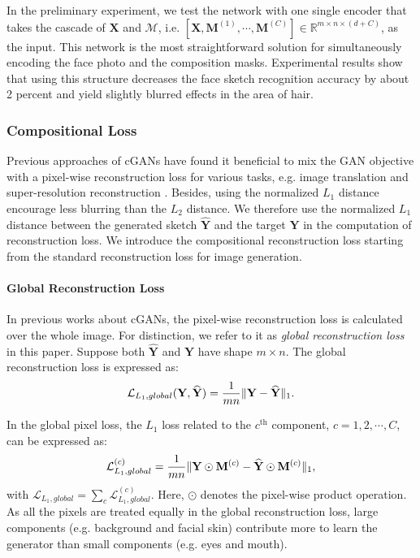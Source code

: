 \documentclass[journal]{IEEEtran}
\begin{document}
In the preliminary experiment, we test the network with one single encoder that takes the cascade of $\mathbf{X}$ and $\mathcal{M}$, i.e. $[\mathbf{X}, \mathbf{M}^{(1)}, \cdots, \mathbf{M}^{(C)}] \in \mathbb{R}^{m \times n \times (d+C)}$, as the input.
This network is the most straightforward solution for simultaneously encoding the face photo and the composition masks. Experimental results show that using this structure decreases the face sketch recognition accuracy by about 2 percent and yield slightly blurred effects in the area of hair.



\subsubsection{Compositional Loss}
\label{sec:comploss}

Previous approaches of cGANs have found it beneficial to mix the GAN objective with a pixel-wise reconstruction loss for various tasks, e.g. image translation \cite{Isola2017Pix2Pix} and super-resolution reconstruction \cite{Johnson2016Perceptual}. Besides, using the normalized $L_1$ distance encourage less blurring than the $L_2$ distance. We therefore use the normalized $L_1$ distance between the generated sketch $\widehat{\mathbf{Y}}$ and the target $\mathbf{Y}$ in the computation of reconstruction loss. We introduce the compositional reconstruction loss starting from the standard reconstruction loss for image generation. 

\paragraph{Global Reconstruction Loss}
In previous works about cGANs, the pixel-wise reconstruction loss is calculated over the whole image. For distinction, we refer to it as \textit{global reconstruction loss} in this paper. Suppose both $\widehat{\mathbf{Y}}$ and $\mathbf{Y}$ have shape $m \times n$. The global reconstruction loss is expressed as:
\begin{equation}
\label{eq:lossglobal}
\mathcal{L}_{L_1, global} (\mathbf{Y}, \widehat{\mathbf{Y}}) = \frac{1}{mn} \Arrowvert \mathbf{Y} - \widehat{\mathbf{Y}} \Arrowvert_1.
\end{equation}

In the global pixel loss, the $L_1$ loss related to the $c^{\text{th}}$ component, $c=1,2,\cdots,C$, can be expressed as:
\begin{equation}
\mathcal{L}_{L_1, global}^{(c)} = \frac{1}{mn} \Arrowvert \mathbf{Y} \odot \mathbf{M}^{(c)} - \widehat{\mathbf{Y}} \odot \mathbf{M}^{(c)} \Arrowvert_1,
    \label{eq:pixlosscmp}
\end{equation}
with $\mathcal{L}_{L_1, global} = \sum_c{\mathcal{L}_{L_1, global}^{(c)}}$. Here, $\odot$ denotes the pixel-wise product operation. 
As all the pixels are treated equally in the global reconstruction loss, large components (e.g. background and facial skin) contribute more to learn the generator than small components (e.g. eyes and mouth).
\end{document}
